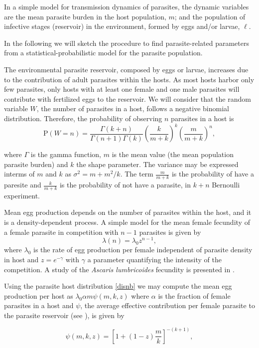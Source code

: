 \documentclass[eng]{MMSB-class-eng}
\begin{document}
In a simple model for transmission dynamics of parasites, 
the dynamic variables  are the mean parasite burden in the host population, $m$; and the population of infective stages (reservoir) in the environment, formed by eggs and/or larvae, $\ell$. 

In the following we will sketch the procedure to find parasite-related parameters from a statistical-probabilistic model for the parasite population.

The environmental parasite reservoir, composed by eggs or larvae, increases due to the contribution of adult parasites within the hosts. As most hosts harbor only few parasites, only hosts with at least one female and one male parasites will contribute with fertilized eggs to the reservoir. We will consider that the random variable $W$, the number of parasites in a host, follows a negative binomial distribution. 
Therefore, the probability of observing $n$ parasites in a host is
\begin{equation}\label{disnb}
\mathrm{P}(W=n)=\frac{\Gamma(k+n)}{\Gamma(n+1)\Gamma(k)}\left( \frac{k}{m+k}\right) ^{k} \left( \frac{m}{m+k}\right) ^n,
\end{equation}
{\color{red}
where $\Gamma$ is the gamma function,  
$m$ is the mean value (the mean population parasite burden) and $k$ the shape parameter. The variance may be expressed interms of  $m$ and  $k$ as $\sigma^2=m+m^2/k$. 
The term $\frac{m}{m+k}$ is the probability of have a paresite and $\frac{k}{m+k}$ is the  probability of not have a parasite, 
in $k+n$ Bernoulli experiment. 



Mean egg production depends on the number of parasites within the host, and it is a density-dependent process. 
A simple model for the mean female fecundity of a female parasite in competition with $n-1$ parasites is given by 
\begin{equation}
\lambda(n)=\lambda_0 z^{n-1},
\end{equation}
where $\lambda_0$ is the rate of egg production per female independent of parasite density in host and $z=e^{-\gamma}$ with $\gamma$ a parameter quantifying the intensity of the competition. A study of the \textit{Ascaris lumbricoides} fecundity is presented in \citet{hall2000geographical}. 


Using the parasite host distribution \eqref{disnb} we may compute the mean egg production per host as \citep{lopez2022general}
$\lambda_0
\alpha m
\psi(m,k,z)$
where $\alpha$  is the fraction of female parasites in a host and $\psi$, the average effective contribution per female parasite to the parasite reservoir (see \citet{churcher2006density,lopez2022general}), is given by}
\begin{equation}\label{psi}
\psi(m,k,z)=\left[ 1+(1-z)\dfrac{m}{k}\right]^{-(k+1)},
\end{equation}
\end{document}

